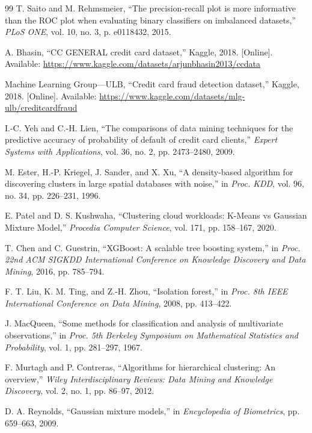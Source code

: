 \documentclass[conference]{IEEEtran}
\begin{document}
\begin{thebibliography}{99}
T. Saito and M. Rehmsmeier, ``The precision-recall plot is more informative than the ROC plot when evaluating binary classifiers on imbalanced datasets,'' \textit{PLoS ONE}, vol. 10, no. 3, p. e0118432, 2015.

A. Bhasin, ``CC GENERAL credit card dataset,'' Kaggle, 2018. [Online]. Available: \url{https://www.kaggle.com/datasets/arjunbhasin2013/ccdata}

Machine Learning Group---ULB, ``Credit card fraud detection dataset,'' Kaggle, 2018. [Online]. Available: \url{https://www.kaggle.com/datasets/mlg-ulb/creditcardfraud}

I.-C. Yeh and C.-H. Lien, ``The comparisons of data mining techniques for the predictive accuracy of probability of default of credit card clients,'' \textit{Expert Systems with Applications}, vol. 36, no. 2, pp. 2473--2480, 2009.

M. Ester, H.-P. Kriegel, J. Sander, and X. Xu, ``A density-based algorithm for discovering clusters in large spatial databases with noise,'' in \textit{Proc. KDD}, vol. 96, no. 34, pp. 226--231, 1996.

E. Patel and D. S. Kushwaha, ``Clustering cloud workloads: K-Means vs Gaussian Mixture Model,'' \textit{Procedia Computer Science}, vol. 171, pp. 158--167, 2020.

T. Chen and C. Guestrin, ``XGBoost: A scalable tree boosting system,'' in \textit{Proc. 22nd ACM SIGKDD International Conference on Knowledge Discovery and Data Mining}, 2016, pp. 785--794.

F. T. Liu, K. M. Ting, and Z.-H. Zhou, ``Isolation forest,'' in \textit{Proc. 8th IEEE International Conference on Data Mining}, 2008, pp. 413--422.

J. MacQueen, ``Some methods for classification and analysis of multivariate observations,'' in \textit{Proc. 5th Berkeley Symposium on Mathematical Statistics and Probability}, vol. 1, pp. 281--297, 1967.

F. Murtagh and P. Contreras, ``Algorithms for hierarchical clustering: An overview,'' \textit{Wiley Interdisciplinary Reviews: Data Mining and Knowledge Discovery}, vol. 2, no. 1, pp. 86--97, 2012.

D. A. Reynolds, ``Gaussian mixture models,'' in \textit{Encyclopedia of Biometrics}, pp. 659--663, 2009.


\end{thebibliography}
\end{document}
